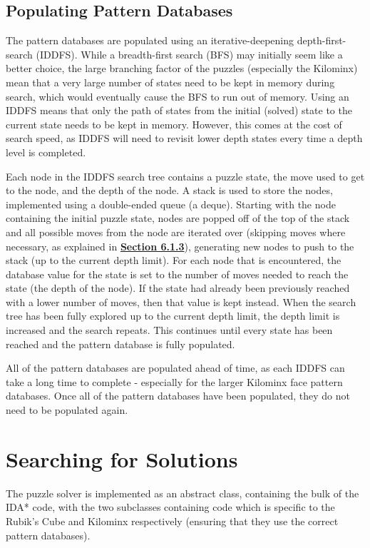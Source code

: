 \subsection{Populating Pattern Databases}
The pattern databases are populated using an iterative-deepening depth-first-search (IDDFS). While a breadth-first search (BFS) may initially seem like a better choice, the large branching factor of the puzzles (especially the Kilominx) mean that a very large number of states need to be kept in memory during search, which would eventually cause the BFS to run out of memory. Using an IDDFS means that only the path of states from the initial (solved) state to the current state needs to be kept in memory. However, this comes at the cost of search speed, as IDDFS will need to revisit lower depth states every time a depth level is completed.

Each node in the IDDFS search tree contains a puzzle state, the move used to get to the node, and the depth of the node. A stack is used to store the nodes, implemented using a double-ended queue (a deque). Starting with the node containing the initial puzzle state, nodes are popped off of the top of the stack and all possible moves from the node are iterated over (skipping moves where necessary, as explained in \textbf{\hyperref[subsection:moves]{Section 6.1.3}}), generating new nodes to push to the stack (up to the current depth limit). For each node that is encountered, the database value for the state is set to the number of moves needed to reach the state (the depth of the node). If the state had already been previously reached with a lower number of moves, then that value is kept instead. When the search tree has been fully explored up to the current depth limit, the depth limit is increased and the search repeats. This continues until every state has been reached and the pattern database is fully populated.

All of the pattern databases are populated ahead of time, as each IDDFS can take a long time to complete - especially for the larger Kilominx face pattern databases. Once all of the pattern databases have been populated, they do not need to be populated again.

\section{Searching for Solutions}
The puzzle solver is implemented as an abstract class, containing the bulk of the IDA* code, with the two subclasses containing code which is specific to the Rubik's Cube and Kilominx respectively (ensuring that they use the correct pattern databases).

